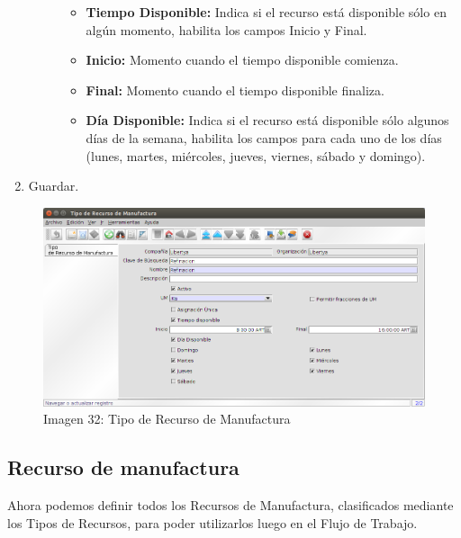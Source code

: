 \documentclass[letterpaper,10pt,spanish]{sphinxmanual}
\begin{document}
\begin{enumerate}
\begin{description}
\begin{itemize}
\item {} 
\textbf{Tiempo Disponible:} Indica si el recurso está disponible sólo en algún momento, habilita los campos Inicio y Final.

\item {} 
\textbf{Inicio:} Momento cuando el tiempo disponible comienza.

\item {} 
\textbf{Final:} Momento cuando el tiempo disponible finaliza.

\item {} 
\textbf{Día Disponible:} Indica si el recurso está disponible sólo algunos días de la semana, habilita los campos para cada uno de los días (lunes, martes, miércoles, jueves, viernes, sábado y domingo).

\end{itemize}

\end{description}

\item {} 
Guardar.

\end{enumerate}
\begin{figure}[htbp]
\centering
\capstart

\includegraphics{ly_tiporecurso.png}
\caption{Imagen 32: Tipo de Recurso de Manufactura}\end{figure}


\subsection{Recurso de manufactura}
\label{manufactura-flujos:recurso-de-manufactura}
Ahora podemos definir todos los Recursos de Manufactura, clasificados mediante los Tipos de Recursos, para poder utilizarlos luego en el Flujo de Trabajo.
\end{document}

